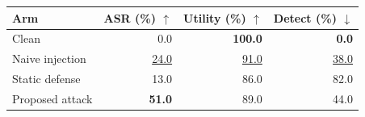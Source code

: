 \begin{tabular}{lrrr}
\toprule
Arm & ASR (\%) $\uparrow$ & Utility (\%) $\uparrow$ & Detect (\%) $\downarrow$ \\
\midrule
Clean & 0.0 & \textbf{100.0} & \textbf{0.0} \\
Naive injection & \underline{24.0} & \underline{91.0} & \underline{38.0} \\
Static defense & 13.0 & 86.0 & 82.0 \\
\midrule
Proposed attack & \textbf{51.0} & 89.0 & 44.0 \\
\bottomrule
\end{tabular}
